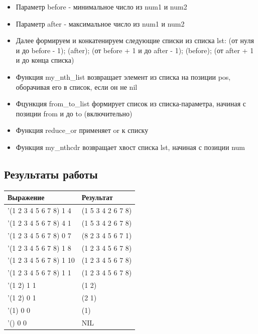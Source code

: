 \documentclass[a4paper,12pt]{article}
\begin{document}
	\begin{itemize}
		\item Параметр before - минимальное число из num1 и num2
		\item Параметр after - максимальное число из num1 и num2
		\item Далее формируем и конкатенируем следующие списки из списка lst: (от нуля и до before - 1); (after); (от before + 1 и до after - 1); (before); (от after + 1 и до конца списка)
		\item Функция my\_nth\_list возвращает элемент из списка на позиции pos, оборачивая его в список, если он не nil
		\item Фцункция from\_to\_list формирует список из списка-параметра, начиная с позиции from и до to (включительно)
		\item Функция reduce\_or применяет or к списку
		\item Функция my\_nthcdr возвращает хвост списка lst, начиная с позиции num
	\end{itemize}
	
	\newpage
	
	\subsection*{Результаты работы}
	
	\begin{table} [h!]
		\begin{center}
			\begin{tabular}{|l|l|}
				\hline
				{\bf  Выражение} &    {\bf Результат} \\
				\hline
				{'(1 2 3 4 5 6 7 8) 1 4} & (1 5 3 4 2 6 7 8)\\
				\hline
				{'(1 2 3 4 5 6 7 8) 4 1} & (1 5 3 4 2 6 7 8)\\
				\hline
				{'(1 2 3 4 5 6 7 8) 0 7} & (8 2 3 4 5 6 7 1)\\
				\hline
				{'(1 2 3 4 5 6 7 8) 1 8} & (1 2 3 4 5 6 7 8)\\
				\hline
				{'(1 2 3 4 5 6 7 8) 1 10} & (1 2 3 4 5 6 7 8)\\
				\hline
				{'(1 2 3 4 5 6 7 8) 1 1} & (1 2 3 4 5 6 7 8)\\
				\hline
				{'(1 2) 1 1} & (1 2)\\
				\hline
				{'(1 2) 0 1} & (2 1)\\
				\hline
				{'(1) 0 0} & (1)\\
				\hline
				{'() 0 0} & NIL\\
				\hline
			\end{tabular}  
			\label{m3}
		\end{center}
	\end{table}
	
\end{document}
